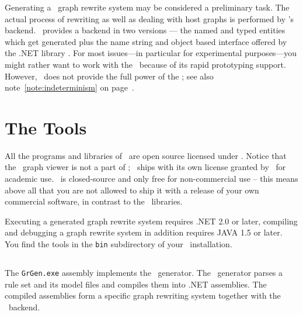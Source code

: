 Generating a \GrG\ graph rewrite system may be considered a preliminary task.
The actual process of rewriting as well as dealing with host graphs is performed by \GrG's backend.
\GrG\ provides a backend  in two versions --- the named and typed entities which get generated plus the name string and object based interface offered by the .NET library \LibGr.
For most issues---in particular for experimental purposes---you might rather want to work with the \GrShell\ because of its rapid prototyping support.
However, \GrShell\ does not provide the full power of the \LibGr; see also note~\ref{note:indeterminism} on page~\pageref{note:indeterminism}.


\section{The Tools}

All the programs and libraries of \GrG\ are open source licensed under .
Notice that the \yComp\ graph viewer is not a part of \GrG ; \yComp\ ships with its own license granted by \yFiles\ for academic use.
\yComp\ is closed-source and only free for non-commercial use --
this means above all that you are not allowed to ship it with a release of your own commercial software, in contrast to the \GrG\ libraries.

Executing a generated graph rewrite system requires .NET 2.0 or later, compiling and debugging a graph rewrite system in addition requires JAVA 1.5 or later. 
You find the tools in the \texttt{bin} subdirectory of your \GrG\ installation.

\subsection{\texttt{}} \label{grgenoptions}

\noindent The \texttt{GrGen.exe} assembly implements the \GrG\ generator.
The \GrG\ generator parses a rule set and its model files and compiles them into .NET assemblies.
The compiled assemblies form a specific graph rewriting system together with the \GrG\ backend.

